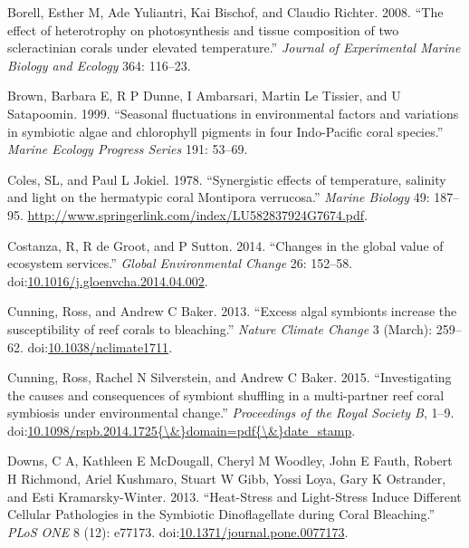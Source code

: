 \documentclass[]{elsarticle} %
\begin{document}
\hypertarget{ref-Borell:2008p108}{}
Borell, Esther M, Ade Yuliantri, Kai Bischof, and Claudio Richter. 2008.
``The effect of heterotrophy on photosynthesis and tissue composition of
two scleractinian corals under elevated temperature.'' \emph{Journal of
Experimental Marine Biology and Ecology} 364: 116--23.

\hypertarget{ref-Brown:1999p3534}{}
Brown, Barbara E, R P Dunne, I Ambarsari, Martin Le Tissier, and U
Satapoomin. 1999. ``Seasonal fluctuations in environmental factors and
variations in symbiotic algae and chlorophyll pigments in four
Indo-Pacific coral species.'' \emph{Marine Ecology Progress Series} 191:
53--69.

\hypertarget{ref-Coles:1978p1124}{}
Coles, SL, and Paul L Jokiel. 1978. ``Synergistic effects of
temperature, salinity and light on the hermatypic coral Montipora
verrucosa.'' \emph{Marine Biology} 49: 187--95.
\url{http://www.springerlink.com/index/LU582837924G7674.pdf}.

\hypertarget{ref-Costanza:2014ex}{}
Costanza, R, R de Groot, and P Sutton. 2014. ``Changes in the global
value of ecosystem services.'' \emph{Global Environmental Change} 26:
152--58.
doi:\href{https://doi.org/10.1016/j.gloenvcha.2014.04.002}{10.1016/j.gloenvcha.2014.04.002}.

\hypertarget{ref-Cunning:2013gp}{}
Cunning, Ross, and Andrew C Baker. 2013. ``Excess algal symbionts
increase the susceptibility of reef corals to bleaching.'' \emph{Nature
Climate Change} 3 (March): 259--62.
doi:\href{https://doi.org/10.1038/nclimate1711}{10.1038/nclimate1711}.

\hypertarget{ref-Cunning:2015ja}{}
Cunning, Ross, Rachel N Silverstein, and Andrew C Baker. 2015.
``Investigating the causes and consequences of symbiont shuffling in a
multi-partner reef coral symbiosis under environmental change.''
\emph{Proceedings of the Royal Society B}, 1--9.
doi:\href{https://doi.org/10.1098/rspb.2014.1725\%7B/\&\%7Ddomain=pdf\%7B/\&\%7Ddate_stamp}{10.1098/rspb.2014.1725\{\textbackslash{}\&\}domain=pdf\{\textbackslash{}\&\}date\_stamp}.

\hypertarget{ref-Downs:2013kc}{}
Downs, C A, Kathleen E McDougall, Cheryl M Woodley, John E Fauth, Robert
H Richmond, Ariel Kushmaro, Stuart W Gibb, Yossi Loya, Gary K Ostrander,
and Esti Kramarsky-Winter. 2013. ``Heat-Stress and Light-Stress Induce
Different Cellular Pathologies in the Symbiotic Dinoflagellate during
Coral Bleaching.'' \emph{PLoS ONE} 8 (12): e77173.
doi:\href{https://doi.org/10.1371/journal.pone.0077173}{10.1371/journal.pone.0077173}.
\end{document}

